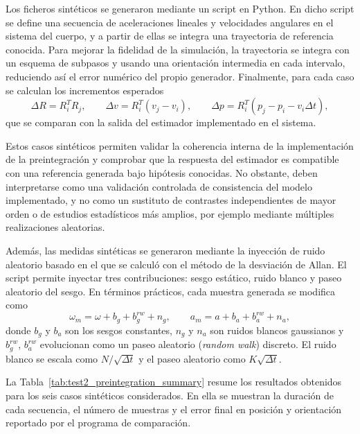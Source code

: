 Los ficheros sint\'eticos se generaron mediante un script en Python. En dicho script se define 
una secuencia de aceleraciones lineales y velocidades angulares en el sistema del cuerpo, y a partir de ellas se integra 
una trayectoria de referencia conocida. Para mejorar la fidelidad de la simulaci\'on, la trayectoria se integra con un 
esquema de subpasos y usando una orientaci\'on intermedia en cada intervalo, reduciendo as\'i el error num\'erico del 
propio generador. Finalmente, para cada caso se calculan los incrementos esperados
\[
\Delta R = R_i^T R_j,\qquad
\Delta v = R_i^T\left(v_j-v_i\right),\qquad
\Delta p = R_i^T\left(p_j-p_i-v_i\Delta t\right),
\]
que se comparan con la salida del estimador implementado en el sistema.

Estos casos sintéticos permiten validar la coherencia interna de la implementación de la preintegración y comprobar que la respuesta del estimador es compatible con una referencia generada bajo hipótesis conocidas. No obstante, deben interpretarse como una validación controlada de consistencia del modelo implementado, y no como un sustituto de contrastes independientes de mayor orden o de estudios estadísticos más amplios, por ejemplo mediante múltiples realizaciones aleatorias.

Además, las medidas sint\'eticas se generaron mediante la inyecci\'on de ruido aleatorio basado en el que se calcul\'o con el 
método de la desviaci\'on de Allan. El script permite inyectar tres contribuciones: sesgo est\'atico, ruido blanco y 
paseo aleatorio del sesgo. En t\'erminos pr\'acticos, cada muestra generada se modifica como
\[
\omega_m = \omega + b_g + b_g^{rw} + n_g,\qquad
a_m = a + b_a + b_a^{rw} + n_a,
\]
donde $b_g$ y $b_a$ son los sesgos constantes, $n_g$ y $n_a$ son ruidos blancos gaussianos y $b_g^{rw}$, $b_a^{rw}$ 
evolucionan como un paseo aleatorio (\textit{random walk}) discreto. El ruido blanco se escala como $N/\sqrt{\Delta t}$ y el paseo aleatorio 
como $K\sqrt{\Delta t}$.

La Tabla~\ref{tab:test2_preintegration_summary} resume los resultados obtenidos para los seis casos sint\'eticos 
considerados. En ella se muestran la duraci\'on de cada secuencia, el n\'umero de muestras y el error final en 
posici\'on y orientaci\'on reportado por el programa de comparaci\'on.

